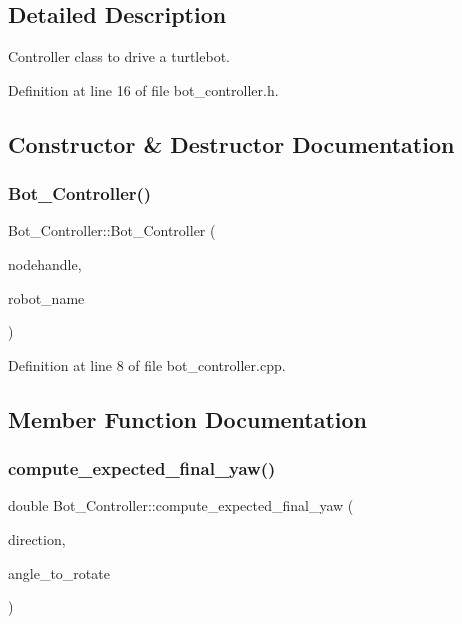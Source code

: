 \subsection{Detailed Description}
Controller class to drive a turtlebot. 

Definition at line 16 of file bot\+\_\+controller.\+h.



\subsection{Constructor \& Destructor Documentation}
\mbox{\label{class_bot___controller_a05104e1b41f7c9cd9cdfe80bbbd53a7d}} 
\subsubsection{\texorpdfstring{Bot\+\_\+\+Controller()}{Bot\_Controller()}}
{\footnotesize\ttfamily Bot\+\_\+\+Controller\+::\+Bot\+\_\+\+Controller (\begin{DoxyParamCaption}\item[{ros\+::\+Node\+Handle $\ast$}]{nodehandle,  }\item[{const std\+::string \&}]{robot\+\_\+name }\end{DoxyParamCaption})}



Definition at line 8 of file bot\+\_\+controller.\+cpp.



\subsection{Member Function Documentation}
\mbox{\label{class_bot___controller_a25e004b632ad2c2c494f8a91f3c24533}} 
\subsubsection{\texorpdfstring{compute\+\_\+expected\+\_\+final\+\_\+yaw()}{compute\_expected\_final\_yaw()}}
{\footnotesize\ttfamily double Bot\+\_\+\+Controller\+::compute\+\_\+expected\+\_\+final\+\_\+yaw (\begin{DoxyParamCaption}\item[{bool}]{direction,  }\item[{double}]{angle\+\_\+to\+\_\+rotate }\end{DoxyParamCaption})}



